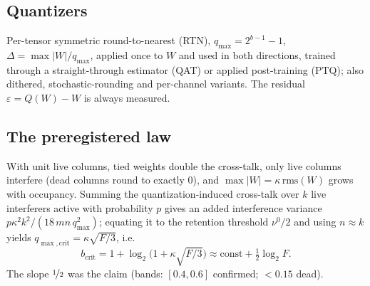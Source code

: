 \documentclass{article}
\begin{document}
\subsection{Quantizers}
Per-tensor symmetric round-to-nearest (RTN), $q_{\max}=2^{b-1}-1$, $\Delta=\max|W|/q_{\max}$, applied
once to $W$ and used in both directions, trained through a straight-through estimator (QAT) or applied post-training
(PTQ); also dithered, stochastic-rounding and per-channel variants. The residual $\varepsilon = Q(W)-W$ is always measured.

\subsection{The preregistered law}
With unit live columns, tied weights double the cross-talk, only live columns interfere
(dead columns round to exactly 0), and $\max|W| = \kappa\,\mathrm{rms}(W)$ grows with occupancy. Summing the
quantization-induced cross-talk over $k$ live interferers active with probability $p$ gives an added interference
variance $p\kappa^2k^2/(18\,mn\,q_{\max}^2)$; equating it to the retention threshold $\nu^0/2$ and using $n\approx k$
yields $q_{\max,\mathrm{crit}} = \kappa\sqrt{F/3}$, i.e.\
\begin{equation}
b_{\mathrm{crit}} = 1+\log_2\!\big(1+\kappa\sqrt{F/3}\big) \approx \mathrm{const}+\tfrac12\log_2F .
\label{eq:law}
\end{equation}
The slope $\nicefrac12$ was the claim (bands: $[0.4,0.6]$ confirmed; $<0.15$ dead).
\end{document}

